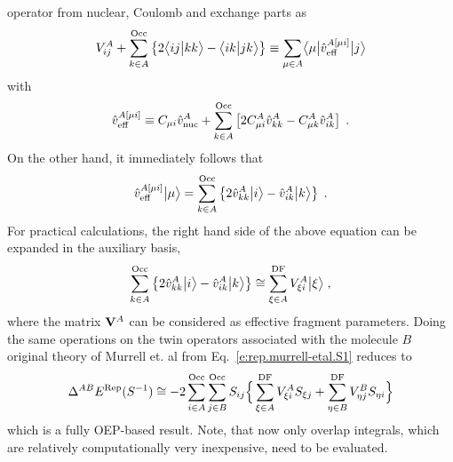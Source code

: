 operator from nuclear, Coulomb and exchange parts as
%
\begin{equation}
 V^A_{ij} + 
 \sum_{k\in A}^{\rm Occ} 
  \left\{ 2\BraKet{ij}{kk} - \BraKet{ik}{jk} \right\}
\equiv \sum_{\mu\in A} \tBraKet{\mu}{ 
\hat{v}^{A[\mu i]}_{\rm eff}
 }{j}
\end{equation}
%
with
%
\begin{equation}
 \hat{v}^{A[\mu i]}_{\rm eff} \equiv C_{\mu i} \hat{v}^A_{\rm nuc} + 
 \sum_{k\in A}^{\rm Occ} \left[
 2C_{\mu i}^A \hat{v}^A_{kk} - C_{\mu k}^A \hat{v}^A_{ik}
 \right] \;.
\end{equation}
%
%
%
On the other hand, it immediately follows that
%
\begin{equation}
 \hat{v}^{A[\mu i]}_{\rm eff} \Ket{\mu} = 
  \sum_{k\in A}^{\rm Occ} \left\{
     2\hat{v}^A_{kk} \Ket{i} - \hat{v}^A_{ik} \Ket{k}
  \right\} \;.
\end{equation}
%
For practical calculations, the right hand side of the above equation can be expanded 
in the auxiliary basis,
%
\begin{equation}
  \sum_{k\in A}^{\rm Occ} \left\{
     2\hat{v}^A_{kk} \Ket{i} - \hat{v}^A_{ik} \Ket{k}
  \right\} \cong
  \sum_{\xi\in A}^{\rm DF} 
  V_{\xi i}^A \Ket{\xi} \;,
\end{equation}
%
where the matrix ${\bf V}^A$ can be considered as effective fragment parameters.
Doing the same operations on the twin operators associated with the molecule $B$
original theory of Murrell et. al from Eq.~\eqref{e:rep.murrell-etal.S1}
reduces to
%
\begin{equation}
  \Delta^{AB}  E^{\rm Rep}(S^{-1}) \cong 
 -2\sum_{i\in A}^{\rm Occ} \sum_{j\in B}^{\rm Occ}
               S_{ij} \Big\{
           \sum_{\xi \in A}^{\rm DF} V_{\xi i}^A S_{\xi j}
         + \sum_{\eta\in B}^{\rm DF} V_{\eta j}^B S_{\eta i}
                \Big\}
\end{equation}
%
which is a fully OEP\hyp{}based result. Note, that now only 
overlap integrals, which are relatively computationally very inexpensive,
need to be evaluated.


